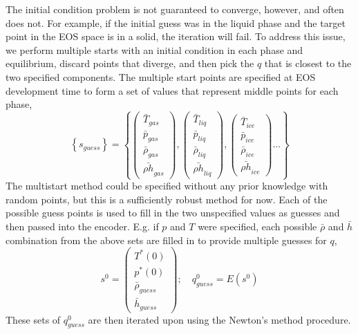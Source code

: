 \documentclass[]{article}
\begin{document}
The initial condition problem is not guaranteed to converge, however,
and often does not.
For example, if the initial guess was in the liquid phase and the target point
in the EOS space is in a solid, the iteration will fail.
To address this issue, we perform multiple starts with an initial condition in each
phase and equilibrium, discard points that diverge, and then pick the
\(q\) that is closest to the two specified components. The multiple
start points are specified at EOS development time to form a set of
values that represent middle points for each phase,
\begin{equation}
\left\{s_{guess}\right\} = \left\{ \left(\begin{array}{c}
\bar{T}_{gas}\\
\bar{p}_{gas}\\
\bar{\rho}_{gas}\\
\bar{\rho h}_{gas}
\end{array}\right),\left(\begin{array}{c}
\bar{T}_{liq}\\
\bar{p}_{liq}\\
\bar{\rho}_{liq}\\
\bar{\rho h}_{liq}
\end{array}\right),\left(\begin{array}{c}
\bar{T}_{ice}\\
\bar{p}_{ice}\\
\bar{\rho}_{ice}\\
\bar{\rho h}_{ice}
\end{array}\right)... \right\}
  \end{equation}
The multistart method could be specified without any prior knowledge
with random points, but this is a sufficiently robust method for
now. Each of the possible guess points is used to fill in the two
unspecified values as guesses and then passed into the encoder.
E.g. if $p$ and $T$ were specified, each possible $\bar{\rho}$ and
$\bar{h}$ combination from the above sets are filled in to provide
multiple guesses for $q$,
\begin{equation}
s^0 = \left(\begin{array}{c}
T^*(0)\\
p^*(0)\\
\bar{\rho}_{guess}\\
\bar{h}_{guess}
\end{array}\right);\quad q^0_{guess}=E\left(s^0\right)
 \end{equation}
 These sets of $q^0_{guess}$ are then iterated upon using the Newton's
 method procedure. 
\end{document}
